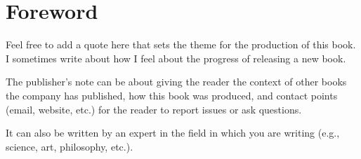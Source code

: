 

\chapter{Foreword}
\label{foreword:cha}

\begin{myquotation}
Feel free to add a quote here that sets the theme for the production of this book. I sometimes write about how I feel about the progress of releasing a new book.\end{myquotation}

The publisher's note can be about giving the reader the context of other books the company has published, how this book was produced, and contact points (email, website, etc.) for the reader to report issues or ask questions.

It can also be written by an expert in the field in which you are writing (e.g., science, art, philosophy, etc.).

\hfil{}\hfil

